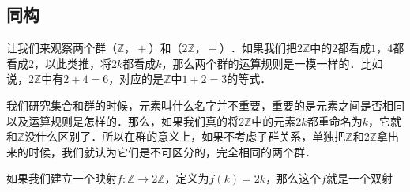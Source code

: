 

\subsection{同构}

让我们来观察两个群$（\mathbb{Z}， +）$和$（2\mathbb{Z}，+）$．如果我们把$2\mathbb{Z}$中的$2$都看成$1$，$4$都看成$2$，以此类推，将$2k$都看成$k$，那么两个群的运算规则是一模一样的．比如说，$2\mathbb{Z}$中有$2+4=6$，对应的是$\mathbb{Z}$中$1+2=3$的等式．

我们研究集合和群的时候，元素叫什么名字并不重要，重要的是元素之间是否相同以及运算规则是怎样的．那么，如果我们真的将$2\mathbb{Z}$中的元素$2k$都重命名为$k$，它就和$\mathbb{Z}$没什么区别了．所以在群的意义上，如果不考虑子群关系，单独把$\mathbb{Z}$和$2\mathbb{Z}$拿出来的时候，我们就认为它们是不可区分的，完全相同的两个群．

如果我们建立一个映射$f:\mathbb{Z}\rightarrow2\mathbb{Z}$，定义为$f(k)=2k$，那么这个$f$就是一个双射

